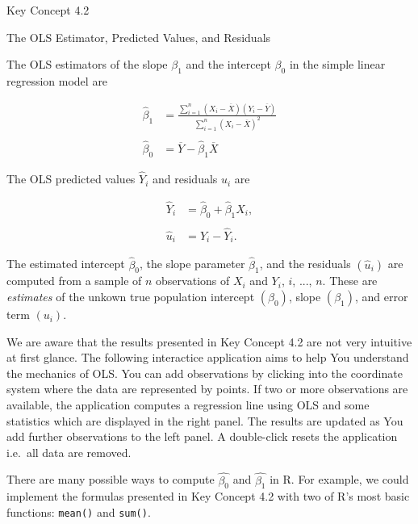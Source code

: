 \documentclass[]{book}
\theoremstyle{definition}
\theoremstyle{definition}
\theoremstyle{definition}
\theoremstyle{remark}
\begin{document}
Key Concept 4.2

The OLS Estimator, Predicted Values, and Residuals

The OLS estimators of the slope \(\beta_1\) and the intercept
\(\beta_0\) in the simple linear regression model are

\begin{align}
  \hat\beta_1 & = \frac{ \sum_{i = 1}^n (X_i - \overline{X})(Y_i - \overline{Y}) } { \sum_{i=1}^n (X_i - \overline{X})^2}  \\
  \\
  \hat\beta_0 & =  \overline{Y} - \hat\beta_1 \overline{X} 
\end{align}

The OLS predicted values \(\widehat{Y}_i\) and residuals \(\hat{u}_i\)
are

\begin{align}
  \widehat{Y}_i & =  \hat\beta_0 + \hat\beta_1 X_i,\\
  \\
  \hat{u}_i & =  Y_i - \widehat{Y}_i. 
\end{align}

The estimated intercept \(\hat{\beta}_0\), the slope parameter
\(\hat{\beta}_1\), and the residuals \(\left(\hat{u}_i\right)\) are
computed from a sample of \(n\) observations of \(X_i\) and \(Y_i\),
\(i\), \(...\), \(n\). These are \emph{estimates} of the unkown true
population intercept \(\left(\beta_0 \right)\), slope
\(\left(\beta_1\right)\), and error term \((u_i)\).

We are aware that the results presented in Key Concept 4.2 are not very
intuitive at first glance. The following interactice application aims to
help You understand the mechanics of OLS. You can add observations by
clicking into the coordinate system where the data are represented by
points. If two or more observations are available, the application
computes a regression line using OLS and some statistics which are
displayed in the right panel. The results are updated as You add further
observations to the left panel. A double-click resets the application
i.e.~all data are removed.

There are many possible ways to compute \(\hat{\beta_0}\) and
\(\hat{\beta_1}\) in R. For example, we could implement the formulas
presented in Key Concept 4.2 with two of R's most basic functions:
\texttt{mean()} and \texttt{sum()}.
\end{document}
